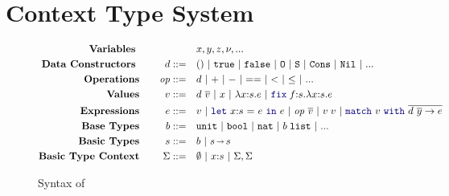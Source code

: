 \section{Context Type System}
\label{sec:context-typing}


\begin{figure}[!t]
  {\small
    \begin{alignat*}{2}
      \text{\textbf{Variables }}& \quad &\quad& x, y, z, \vnu, ...
      \\\text{\textbf{Data Constructors }}& \quad &d ::= \quad & () ~|~ \Code{true} ~|~ \Code{false} ~|~ \Code{O} ~|~ \Code{S} ~|~ \Code{Cons} ~|~ \Code{Nil} ~|~ ...
      \\\text{\textbf{Operations}}& \quad & \primop ::= \quad & d ~|~ {+} ~|~ {-} ~|~ {==} ~|~ {<} ~|~ {\leq} ~|~ ...
      \\ \text{\textbf{Values}}& \quad  & v ::= \quad & d\ \overline{v} ~|~ x ~|~ \zlam{x}{s}{e} ~|~ \zfix{f}{s}{x}{s}{e}
      \\ \text{\textbf{Expressions}}& \quad & e ::=\quad & v ~|~ \zlet{x{:}s}{e}{e} ~|~ \primop\ \overline{v} ~|~  v\;v ~|~ \match{v} \overline{d\ \overline{y} \to e}
      \\\text{\textbf{Base Types}}& \quad & b  ::= \quad &  \Code{unit} ~|~ \Code{bool} ~|~ \Code{nat} ~|~ \List[b] ~|~ ...
      \\\text{\textbf{Basic Types}}& \quad & s  ::= \quad &  b ~|~ s\sarr s
      \\\text{\textbf{Basic Type Context}}& \quad & \Sigma ::= \quad &  \emptyset ~|~ x{:}s ~|~ \Sigma, \Sigma
    \end{alignat*}
  }
  \vspace{-18pt}
  \caption{Syntax of \langname{}}
  \label{fig:core-lang-syntax}
  \end{figure}

